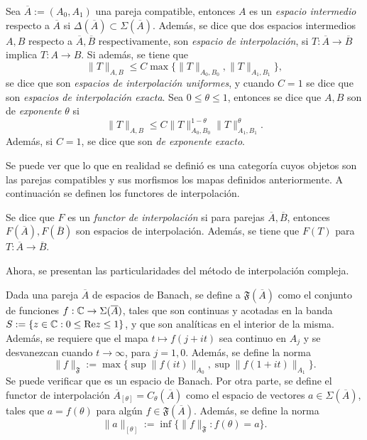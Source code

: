 \begin{definition}
	Sea $\overline{A}:=(A_0, A_1)$ una pareja compatible, entonces $A$ es un \textit{espacio intermedio} respecto a $\overline{A}$ si $\Delta(\overline{A}) \subset \Sigma(\overline{A})$. Además, se dice que dos espacios intermedios $A, B$ respecto a $\overline{A},\overline{B}$ respectivamente, son \textit{espacio de interpolación}, si  $T:\overline{A}\to\overline{B}$ implica $T:A\to B$. Si además, se tiene que 
	\begin{equation*}
		\|T\|_{A, B} \leq C \max\{\|T\|_{A_0, B_0}, \|T\|_{A_1, B_1}\},
	\end{equation*}
	se dice que son \textit{espacios de interpolación uniformes}, y cuando $C=1$ se dice que son \textit{espacios de interpolación exacta}. Sea $0\leq\theta\leq1$, entonces se dice que $A, B$ son de \textit{exponente} $\theta$ si 
	\begin{equation*}
		\|T\|_{A, B} \leq C \|T\|_{A_0, B_0}^{1-\theta} \|T\|_{A_1, B_1}^{\theta}.
	\end{equation*}
	Además, si $C=1$, se dice que son \textit{de exponente exacto}.
\end{definition}
\begin{remark}
	Se puede ver que lo que en realidad se definió es una categoría cuyos objetos son las parejas compatibles y sus morfismos los mapas definidos anteriormente. A continuación se definen los functores de interpolación.
\end{remark}
\begin{definition}
	Se dice que $F$ es un \textit{functor de interpolación} si para parejas $\overline{A}, \overline{B}$, entonces $F(\overline{A}), F(\overline{B})$ son espacios de interpolación. Además, se tiene que $F(T)$ para $T:\overline{A}\to\overline{B}$.
\end{definition}
Ahora, se presentan las particularidades del método de interpolación compleja.
\begin{definition}
	Dada una pareja $\overline{A}$ de espacios de Banach, se define a $\mathfrak{F}(\overline{A})$ como el conjunto de funciones $f:\mathbb{C}\to\Sigma(\overline{A})$, tales que son continuas y acotadas en la banda $S:=\{z\in\mathbb{C} : 0\leq\mathrm{Re} z\leq1\}$, y que son analíticas en el interior de la misma. Además, se requiere que el mapa $t\mapsto f(j+it)$ sea continuo en $A_j$ y se desvanezcan cuando $t\to\infty$, para $j=1,0$. Además, se define la norma 
	\begin{equation*}
		\|f\|_{\mathfrak{F}} := \max\{\sup\|f(it)\|_{A_0}, \sup\|f(1+it)\|_{A_1}\}.
	\end{equation*}
	Se puede verificar que es un espacio de Banach. Por otra parte, se define el functor de interpolación $\overline{A}_{[\theta]}=C_\theta(\overline{A})$ como el espacio de vectores $a\in\Sigma(\overline{A})$, tales que $a=f(\theta)$ para algún $f\in \mathfrak{F}(\overline{A})$. Además, se define la norma
	\begin{equation*}
		\|a\|_{[\theta]} := \inf \{\|f\|_{\mathfrak{F}} : f(\theta) = a\}.
	\end{equation*}
\end{definition}
